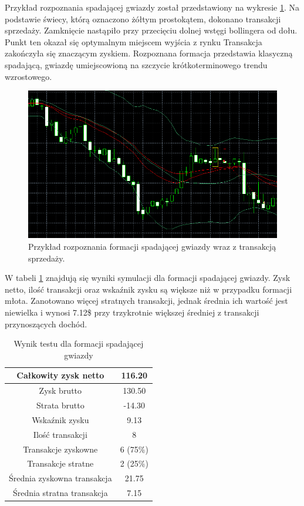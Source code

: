 \documentclass[pdflatex,11pt]{aghdpl}
\begin{document}
Przykład rozpoznania spadającej gwiazdy został przedstawiony na wykresie \ref{przyklad_gwiazda}. Na podstawie świecy, którą oznaczono żółtym prostokątem, dokonano transakcji sprzedaży. Zamknięcie nastąpiło przy przecięciu dolnej wstęgi bollingera od dołu. Punkt ten okazał się optymalnym miejscem wyjścia z rynku Transakcja zakończyła się znaczącym zyskiem. Rozpoznana formacja przedstawia klasyczną spadającą, gwiazdę umiejscowioną na szczycie krótkoterminowego trendu wzrostowego.
\begin{figure}[h!]
\begin{center}
\includegraphics[width=14cm]{shootingstar/przyklad.png}
\caption{Przykład rozpoznania formacji spadającej gwiazdy wraz z transakcją sprzedaży.}
\label{przyklad_gwiazda}
\end{center}
\end{figure} 
W tabeli \ref{raport_gwiazda} znajdują się wyniki symulacji dla formacji spadającej gwiazdy. Zysk netto, ilość transakcji oraz wskaźnik zysku są większe niż w przypadku formacji młota. Zanotowano więcej stratnych transakcji, jednak średnia ich wartość jest niewielka i wynosi 7.12\$ przy trzykrotnie większej średniej z transakcji przynoszących dochód.  
\begin{table}[h!]
\caption{Wynik testu dla formacji spadającej gwiazdy}
\begin{center}
\begin{tabular}{|c|c|}
\hline 
Całkowity zysk netto & 116.20\\
\hline
Zysk brutto & 130.50 \\
\hline
Strata brutto & -14.30 \\
\hline
Wskaźnik zysku & 9.13 \\
\hline
\hline
Ilość transakcji & 8 \\
\hline
Transakcje zyskowne & 6 (75\%) \\
\hline
Transakcje stratne & 2 (25\%) \\
\hline
\hline
Średnia zyskowna transakcja & 21.75 \\
\hline
Średnia stratna transakcja & 7.15 \\
\hline
\end{tabular} 
\label{raport_gwiazda}
\end{center}
\end{table}
\end{document}
